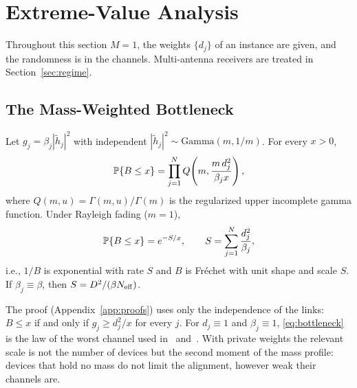 \section{Extreme-Value Analysis}
\label{sec:analysis}

Throughout this section $M=1$, the weights $\{d_j\}$ of an instance are given, and the randomness is in the channels. Multi-antenna receivers are treated in Section~\ref{sec:regime}.

\subsection{The Mass-Weighted Bottleneck}

\begin{theorem}\label{thm:bottleneck}
Let $g_j=\beta_j|\tilde h_j|^2$ with independent $|\tilde h_j|^2\sim\mathrm{Gamma}(m,1/m)$. For every $x>0$,
\begin{equation}
\mathbb{P}\{B\le x\}=\prod_{j=1}^N Q\!\left(m,\frac{m\,d_j^2}{\beta_j x}\right),
\label{eq:bottleneck_m}
\end{equation}
where $Q(m,u)=\Gamma(m,u)/\Gamma(m)$ is the regularized upper incomplete gamma function. Under Rayleigh fading ($m=1$),
\begin{equation}
\mathbb{P}\{B\le x\}=e^{-S/x},\qquad S=\sum_{j=1}^N\frac{d_j^2}{\beta_j},
\label{eq:bottleneck}
\end{equation}
i.e., $1/B$ is exponential with rate $S$ and $B$ is Fr\'echet with unit shape and scale $S$. If $\beta_j\equiv\beta$, then $S=D^2/(\beta N_{\mathrm{eff}})$.
\end{theorem}

The proof (Appendix~\ref{app:proofs}) uses only the independence of the links: $B\le x$ if and only if $g_j\ge d_j^2/x$ for every $j$. For $d_j\equiv1$ and $\beta_j\equiv1$, \eqref{eq:bottleneck} is the law of the worst channel used in~\cite[Cor.~2]{liu2020scaling} and~\cite[Lemma~5]{chen2024view}. With private weights the relevant scale is not the number of devices but the second moment of the mass profile: devices that hold no mass do not limit the alignment, however weak their channels are.

